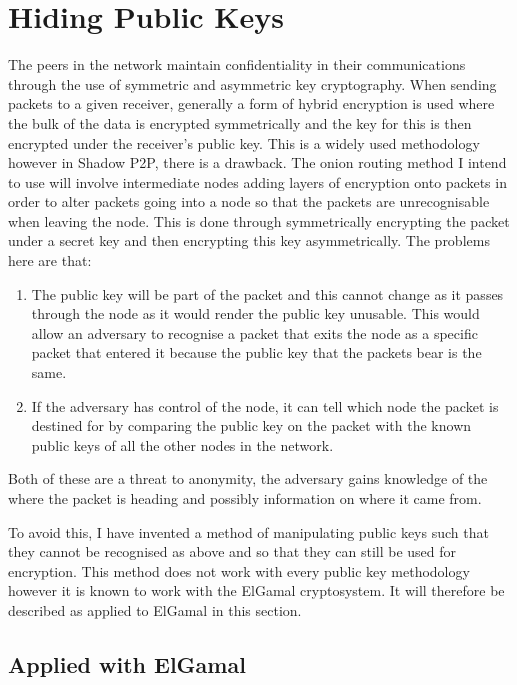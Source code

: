 \documentclass[ %
                    author={Luke Murray},
                supervisor={Dr. Simon Hollis},
                     title={Shadow Peer-to-Peer Networks},
                  subtitle={},
                    degree={MEng},
                      year={2013} ]{thesis}
\begin{document}
\section{Hiding Public Keys}

The peers in the network maintain confidentiality in their communications through the use of symmetric and asymmetric key cryptography. When sending packets to a given receiver, generally a form of hybrid encryption is used where the bulk of the data is encrypted symmetrically and the key for this is then encrypted under the receiver's public key. This is a widely used methodology %
however in Shadow P2P, there is a drawback. The onion routing method I intend to use will involve intermediate nodes adding layers of encryption onto packets in order to alter packets going into a node so that the packets are unrecognisable when leaving the node. This is done through symmetrically encrypting the packet under a secret key and then encrypting this key asymmetrically. The problems here are that:
\begin{enumerate}
\item The public key will be part of the packet and this cannot change as it passes through the node as it would render the public key unusable. This would allow an adversary to recognise a packet that exits the node as a specific packet that entered it because the public key that the packets bear is the same.
\item If the adversary has control of the node, it can tell which node the packet is destined for by comparing the public key on the packet with the known public keys of all the other nodes in the network.
\end{enumerate}
Both of these are a threat to anonymity, the adversary gains knowledge of the where the packet is heading and possibly information on where it came from.

To avoid this, I have invented a method of manipulating public keys such that they cannot be recognised as above and so that they can still be used for encryption. This method does not work with every public key methodology however it is known to work with the ElGamal cryptosystem\cite{elgamal1985public}. It will therefore be described as applied to ElGamal in this section.

\subsection{Applied with ElGamal}
\end{document}
